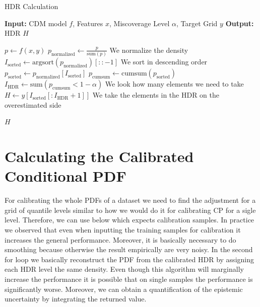 \begin{algorithm}
    \caption{HDR Calculation}\label{alg:hdr}
    \begin{algorithmic}
        \STATE\textbf{Input:} CDM model $f$, Features $x$, Miscoverage Level $\alpha$, Target Grid $y$
        \STATE\textbf{Output:} HDR $H$

        \STATE$p \leftarrow f(x, y)$
        \STATE$p_{\text{normalized}} \leftarrow \frac{p}{\text{sum}(p)}$ We normalize the density
        \STATE$I_{\text{sorted}} \leftarrow \text{argsort}(p_{\text{normalized}})[::-1]$ We sort in descending order
        \STATE$p_{\text{sorted}} \leftarrow p_{\text{normalized}}[I_{\text{sorted}}]$
        \STATE$p_{\text{cumsum}} \leftarrow \text{cumsum}(p_{\text{sorted}})$
        \STATE$I_{\text{HDR}} \leftarrow \text{sum}(p_{\text{cumsum}} < 1 - \alpha)$ We look how many elements we need to take
        \STATE$H \leftarrow y[I_{\text{sorted}}[:I_{\text{HDR}} + 1]]$ We take the elements in the HDR on the overestimated side

        \RETURN$H$
    \end{algorithmic}
\end{algorithm}

\section{Calculating the Calibrated Conditional PDF}

For calibrating the whole PDFs of a dataset we need to find the adjustment for a grid of quantile levels similar to how we would do it for calibrating CP for a sigle level. Therefore, we can use  below which expects calibration samples. In practice we observed that even when inputting the training samples for calibration it increases the general performance. Moreover, it is basically necessary to do smoothing because otherwise the result empirically are very noisy. In the second for loop we basically reconstruct the PDF from the calibrated HDR by assigning each HDR level the same density. Even though this algorithm will marginally increase the performance it is possible that on single samples the performance is significantly worse. Moreover, we can obtain a quantification of the epistemic uncertainty by integrating the returned value.


